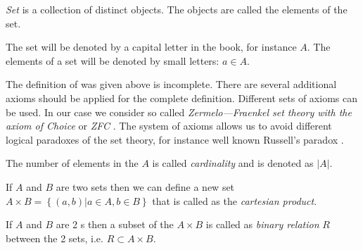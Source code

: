 \begin{definition}[Set]
  \label{def:set}
  \textit{Set} is a collection of distinct objects. The objects are called
  the elements of the set. 

  The set will be denoted by a capital letter in
  the book, for instance $A$. The elements of a set will be denoted by
  small letters: $a \in A$.
\end{definition}

\begin{remark}[Set]
  \label{rem:set}
  The definition of  was given
  above is incomplete. There are several additional axioms should be
  applied for the complete definition. Different sets of axioms can be
  used. In our case we consider so called \textit{Zermelo—Fraenkel set theory
  with the axiom of Choice} or \textit{ZFC} \cite{wiki:zfc}. The
  system of axioms allows us to avoid different logical paradoxes of
  the set theory, for instance well known Russell's
  paradox \cite{wiki:russell_paradox}.
\end{remark}

\begin{definition}[Cardinality]
\label{def:cardinality}
The number of elements in the  $A$ is called
\textit{cardinality} and is denoted as $\left|A\right|$.
\end{definition}

\begin{definition}
  \label{def:cartesian_product}
  If $A$ and $B$ are two sets then we can define a new set $A \times B
  = \left\{(a,b)|a \in A, b \in B\right\}$ that is called as the
  \textit{cartesian product}.
\end{definition}

\begin{definition}
  \label{def:binary_relation}
  If $A$ and $B$ are 2 s then a subset of the
   $A \times B$ is
  called as \textit{binary relation} $R$ between the 2 sets, i.e. $R
  \subset A \times B$.
\end{definition}

